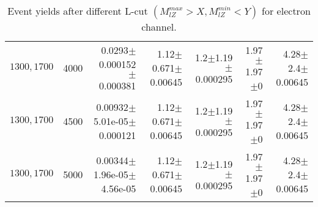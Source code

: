 \documentclass[]{article}
\begin{document}
\begin{table}
\begin{center}
{\begin{tabular}{ |r|r|r|r|r|r|r|}
$1300, 1700$ & 4000 & 0.0293$\pm$0.000152$\pm$0.000381 & 1.12$\pm$0.671$\pm$0.00645 & 1.2$\pm$1.19$\pm$0.000295 & 1.97$\pm$1.97$\pm$0 & 4.28$\pm$2.4$\pm$0.00645 \\
$1300, 1700$ & 4500 & 0.00932$\pm$5.01e-05$\pm$0.000121 & 1.12$\pm$0.671$\pm$0.00645 & 1.2$\pm$1.19$\pm$0.000295 & 1.97$\pm$1.97$\pm$0 & 4.28$\pm$2.4$\pm$0.00645 \\
$1300, 1700$ & 5000 & 0.00344$\pm$1.96e-05$\pm$4.56e-05 & 1.12$\pm$0.671$\pm$0.00645 & 1.2$\pm$1.19$\pm$0.000295 & 1.97$\pm$1.97$\pm$0 & 4.28$\pm$2.4$\pm$0.00645 \\
\hline 
\end{tabular}
}
\end{center}
\caption{Event yields after different L-cut $(M_{lZ}^{max} > X, M_{lZ}^{min} < Y)$ for electron channel.}
\end{table}
\end{document}
